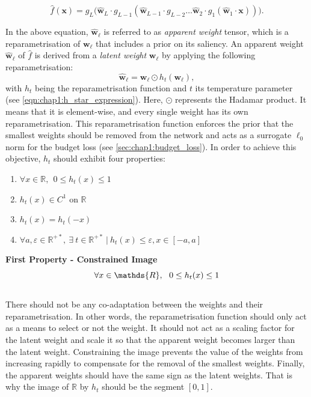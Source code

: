 \begin{equation}
  \label{eqn:chap1:layer_eq_f_hat}
  \hat{f}(\mathbf{x}) = g_L \big(\mathbf{\hat w}_L \cdot g_{L-1}(\mathbf{\hat w}_{L-1} \cdot g_{L-2}
  \dots\mathbf{\hat w}_2 \cdot g_1(\mathbf{\hat w}_1 \cdot \mathbf{x}))\big).
\end{equation}

\noindent In the above equation, $\mathbf{\hat w}_\ell$ is referred to as
\textit{apparent weight} tensor, which is a reparametrisation of
$\mathbf{w}_\ell$ that includes a prior on its saliency. An apparent weight
$\mathbf{\hat w}_\ell$ of $\hat{f}$ is derived from a \emph{latent weight}
$\mathbf{w}_\ell$ by applying the following reparametrisation:
\begin{equation}
  \label{eqn:chap1:reparam}
  \mathbf{\hat w}_\ell = \mathbf{w}_\ell  \odot h_t(\mathbf{w}_\ell),
\end{equation}
\noindent with $h_t$ being the reparametrisation function and $t$ its
temperature parameter (see \cref{eqn:chap1:h_star_expression}). Here, $\odot$
represents the Hadamar product. It means that it is element-wise, and every
single weight has its own reparametrisation. This reparametrisation function
enforces the prior that the smallest weights should be removed from the network
and acts as a surrogate $\ell_0$ norm for the budget loss (see
\cref{sec:chap1:budget_loss}). In order to achieve this objective, $h_t$ should
exhibit four properties: \\

\begin{enumerate}
  \item $\forall x \in \mathds{R},~~ 0 \leq h_t(x) \leq 1 $
  \item $h_t(x) \in C^1 \text{ on } \mathds{R}$
  \item $h_t(x) = h_t(-x)$
  \item $\forall a,\varepsilon \in\mathds{R}^{+\ast},~ \exists ~t
          \in\mathds{R}^{+\ast} ~ | ~ h_t(x) \leq \varepsilon, x \in [-a,a]$\\
\end{enumerate}

\noindent\textbf{First Property - Constrained Image} \\
\begin{equation}
  \centering
  \forall x \in \mathds{R},~~ 0 \leq h_t(x) \leq 1
  \label{eqn:chap1:reparam_prop1}
\end{equation}
\\
There should not be any co-adaptation between the weights and their
reparametrisation. In other words, the reparametrisation function should only
act as a means to select or not the weight. It should not act as a scaling
factor for the latent weight and scale it so that the apparent weight becomes
larger than the latent weight. Constraining the image prevents the value of the
weights from increasing rapidly to compensate for the removal of the smallest
weights. Finally, the apparent weights should have the same sign as the latent
weights. That is why the image of $\mathds{R}$ by $h_t$ should be the segment
$[0,1]$.\\

